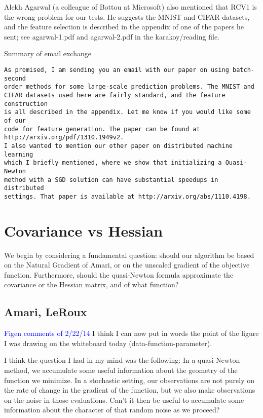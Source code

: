 \documentclass[12pt]{article}
\begin{document}
Alekh Agarwal (a colleague of Bottou at Microsoft) also mentioned that RCV1 is the wrong problem for our tests. He suggests
the MNIST and CIFAR datasets, and the feature selection is described in the appendix of one of the papers he sent; see agarwal-1.pdf and agarwal-2.pdf in the karakoy/reading file. 

Summary of email exchange
\begin{verbatim}
As promised, I am sending you an email with our paper on using batch-second
order methods for some large-scale prediction problems. The MNIST and 
CIFAR datasets used here are fairly standard, and the feature construction 
is all described in the appendix. Let me know if you would like some of our 
code for feature generation. The paper can be found at 
http://arxiv.org/pdf/1310.1949v2.
I also wanted to mention our other paper on distributed machine learning 
which I briefly mentioned, where we show that initializing a Quasi-Newton 
method with a SGD solution can have substantial speedups in distributed 
settings. That paper is available at http://arxiv.org/abs/1110.4198.
\end{verbatim}


\section{Covariance vs Hessian}
\label{covariance}

We begin by considering a fundamental question: should our algorithm be based on the Natural Gradient of Amari, or on
the unscaled gradient of the objective function. Furthermore, should the quasi-Newton formula approximate the covariance or the Hessian matrix, and of what function?

\subsection{Amari, LeRoux}
\textcolor{blue}{Figen comments of 2/22/14}
I think I can now put in words the point of the figure I was drawing on the whiteboard today (data-function-parameter).

I think the question I had in my mind was the following: In a quasi-Newton method, we accumulate some useful information about the geometry of the function we minimize.  In a stochastic setting, our observations are not purely on the rate of change in the gradient of the function, but we also make observations on the noise in those evaluations.  Can't it then be useful to accumulate some information about the character of that random noise as we proceed?
\end{document}

